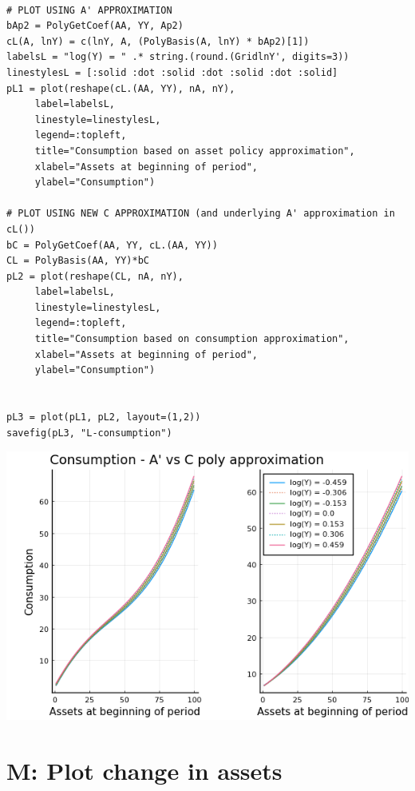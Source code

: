 \documentclass[12pt]{article}
\begin{document}
\begin{lstlisting}[language=JuliaLocal, style=julia]

# PLOT USING A' APPROXIMATION
bAp2 = PolyGetCoef(AA, YY, Ap2)
cL(A, lnY) = c(lnY, A, (PolyBasis(A, lnY) * bAp2)[1])
labelsL = "log(Y) = " .* string.(round.(GridlnY', digits=3))
linestylesL = [:solid :dot :solid :dot :solid :dot :solid]
pL1 = plot(reshape(cL.(AA, YY), nA, nY),
     label=labelsL,
     linestyle=linestylesL,
     legend=:topleft,
     title="Consumption based on asset policy approximation",
     xlabel="Assets at beginning of period",
     ylabel="Consumption")

# PLOT USING NEW C APPROXIMATION (and underlying A' approximation in cL())
bC = PolyGetCoef(AA, YY, cL.(AA, YY))
CL = PolyBasis(AA, YY)*bC
pL2 = plot(reshape(CL, nA, nY),
     label=labelsL,
     linestyle=linestylesL,
     legend=:topleft,
     title="Consumption based on consumption approximation",
     xlabel="Assets at beginning of period",
     ylabel="Consumption")


pL3 = plot(pL1, pL2, layout=(1,2))
savefig(pL3, "L-consumption")
\end{lstlisting}

\includegraphics[]{problem sets/ps8/L-consumption.png}









\newpage
\section*{M: Plot change in assets}
\end{document}
